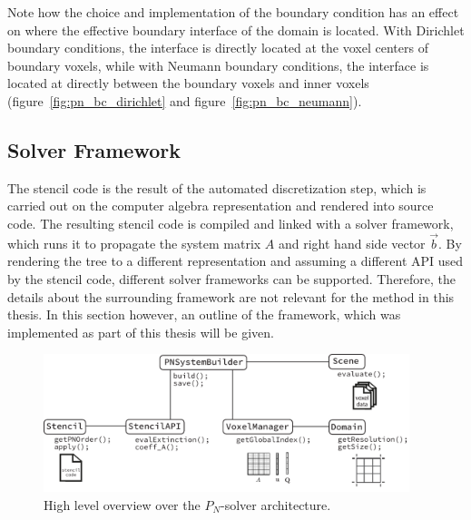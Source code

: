 Note how the choice and implementation of the boundary condition has an effect on where the effective boundary interface of the domain is located. With Dirichlet boundary conditions, the interface is directly located at the voxel centers of boundary voxels, while with Neumann boundary conditions, the interface is located at directly between the boundary voxels and inner voxels (figure~\ref{fig:pn_bc_dirichlet} and figure~\ref{fig:pn_bc_neumann}).

\subsection{Solver Framework}
\label{sec:pn_framework}

The stencil code is the result of the automated discretization step, which is carried out on the computer algebra representation and rendered into source code. The resulting stencil code is compiled and linked with a solver framework, which runs it to propagate the system matrix $A$ and right hand side vector $\vec{b}$. By rendering the tree to a different representation and assuming a different API used by the stencil code, different solver frameworks can be supported.
Therefore, the details about the surrounding framework are not relevant for the method in this thesis. In this section however, an outline of the framework, which was implemented as part of this thesis will be given.
\begin{figure}[h]
\centering
\includegraphics[width=0.95\textwidth]{04_pn_method/figures/fig_pn_solver_architecture.pdf}
\caption{High level overview over the $P_N$-solver architecture.}
\label{fig:pn_classes}
\end{figure}

